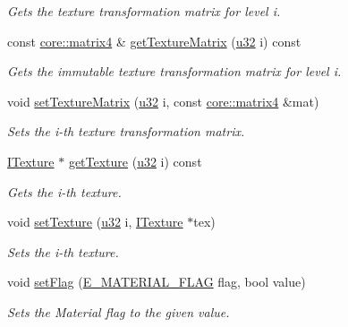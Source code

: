 \begin{DoxyCompactItemize}
\begin{DoxyCompactList}\small\item\em Gets the texture transformation matrix for level i. \end{DoxyCompactList}\item 
const \hyperlink{namespaceirr_1_1core_a73fa92e638c5ca97efd72da307cc9b65}{core\+::matrix4} \& \hyperlink{classirr_1_1video_1_1SMaterial_a6b0adff4b14c80da0be8e8d600252fcd}{get\+Texture\+Matrix} (\hyperlink{namespaceirr_a0416a53257075833e7002efd0a18e804}{u32} i) const
\begin{DoxyCompactList}\small\item\em Gets the immutable texture transformation matrix for level i. \end{DoxyCompactList}\item 
void \hyperlink{classirr_1_1video_1_1SMaterial_a6e1a89f5005226a9cecb5272ef44ba7d}{set\+Texture\+Matrix} (\hyperlink{namespaceirr_a0416a53257075833e7002efd0a18e804}{u32} i, const \hyperlink{namespaceirr_1_1core_a73fa92e638c5ca97efd72da307cc9b65}{core\+::matrix4} \&mat)
\begin{DoxyCompactList}\small\item\em Sets the i-\/th texture transformation matrix. \end{DoxyCompactList}\item 
\hyperlink{classirr_1_1video_1_1ITexture}{I\+Texture} $\ast$ \hyperlink{classirr_1_1video_1_1SMaterial_ad5883da3db8087fbbb74f7bb23e82874}{get\+Texture} (\hyperlink{namespaceirr_a0416a53257075833e7002efd0a18e804}{u32} i) const
\begin{DoxyCompactList}\small\item\em Gets the i-\/th texture. \end{DoxyCompactList}\item 
void \hyperlink{classirr_1_1video_1_1SMaterial_a44dc38e7d4a78434d12ffd02e88e3d60}{set\+Texture} (\hyperlink{namespaceirr_a0416a53257075833e7002efd0a18e804}{u32} i, \hyperlink{classirr_1_1video_1_1ITexture}{I\+Texture} $\ast$tex)
\begin{DoxyCompactList}\small\item\em Sets the i-\/th texture. \end{DoxyCompactList}\item 
void \hyperlink{classirr_1_1video_1_1SMaterial_a460db947d8e2022c6be895b77a65bbda}{set\+Flag} (\hyperlink{namespaceirr_1_1video_a8a3bc00ae8137535b9fbc5f40add70d3}{E\+\_\+\+M\+A\+T\+E\+R\+I\+A\+L\+\_\+\+F\+L\+AG} flag, bool value)
\begin{DoxyCompactList}\small\item\em Sets the Material flag to the given value. \end{DoxyCompactList}\item 

\end{DoxyCompactItemize}
